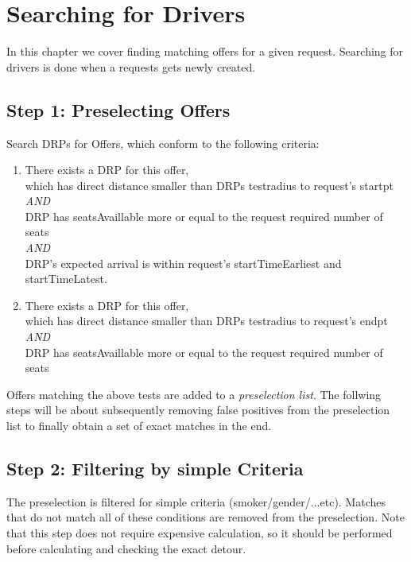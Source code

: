\chapter{Searching for Drivers}
\label{searchForDrivers}

In this chapter we cover finding matching offers for a given request.
Searching for drivers is done when a requests gets newly created.

\section{Step 1: Preselecting Offers}

Search DRPs for Offers, which conform to the following criteria:
\begin{enumerate}
\item{There exists a DRP for this offer,\\
       which has direct distance smaller than DRPs testradius to request's startpt \\
	\emph{AND} \\
	DRP has seatsAvaillable more or equal to the request required number of seats\\
	\emph{AND} \\
	DRP's expected arrival is within request's startTimeEarliest and startTimeLatest.
      }
\item{There exists a DRP for this offer, \\ 
       which has direct distance smaller than DRPs testradius to request's endpt\\
	\emph{AND} \\
	DRP has seatsAvaillable more or equal to the request required number of seats
	}
\end{enumerate}
Offers matching the above tests are added to a  \emph{preselection list}.
The follwing steps will be about subsequently removing false positives from the preselection list 
to finally obtain a set of exact matches in the end.
\section{Step 2: Filtering by simple Criteria}
\label{sfdFilteringSimpleCriteria}
The preselection is filtered for simple criteria (smoker/gender/...etc).
Matches that do not match all of these conditions are removed from the preselection.
Note that this step does not require expensive calculation, so it should be performed before
calculating and checking the exact detour.

